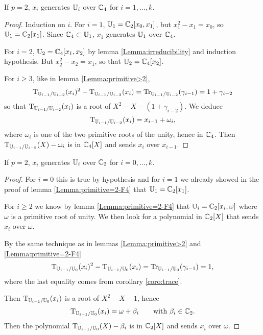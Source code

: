 \begin{lemma}
  \label{Lemma:primitive=2-F4}
  If $p=2$, $x_i$ generates $\mathbb{U}_i$ over $\mathbb{C}_4$ for $i=1,\ldots,k$.
\end{lemma}
\begin{proof}
  Induction on $i$. For $i=1$, $\mathbb{U}_1 = \mathbb{C}_2[x_0,x_1]$, but
  $x_1^2-x_1=x_0$, so $\mathbb{U}_1 = \mathbb{C}_2[x_1]$. Since $\mathbb{C}_4\subset\mathbb{U}_1$,
  $x_1$ generates $\mathbb{U}_1$ over $\mathbb{C}_4$.
  
  For $i=2$, $\mathbb{U}_2=\mathbb{C}_4[x_1,x_2]$ by lemma \ref{Lemma:irreducibility}
  and induction hypothesis. But $x_2^2-x_2=x_1$, so that
  $\mathbb{U}_2=\mathbb{C}_4[x_2]$.

  For $i\ge3$, like in lemma \ref{Lemma:primitive>2},
  \begin{equation*}
    \operatorname{T}_{\mathbb{U}_{i-1}/\mathbb{U}_{i-2}}(x_i)^2 - \operatorname{T}_{\mathbb{U}_{i-1}/\mathbb{U}_{i-2}}(x_i) =
    \operatorname{Tr}_{\mathbb{U}_{i-1}/\mathbb{U}_{i-2}}(\gamma_{i-1}) = 1+\gamma_{i-2}
  \end{equation*}
  so that $\operatorname{T}_{\mathbb{U}_{i-1}/\mathbb{U}_{i-2}}(x_i)$ is a root of
  $X^2-X-(1+\gamma_{i-2})$. We deduce
  \[\operatorname{T}_{\mathbb{U}_{i-1}/\mathbb{U}_{i-2}}(x_i) = x_{i-1} + \omega_i\text{,}\]
  where $\omega_i$ is one of the two primitive roots of the unity,
  hence in $\mathbb{C}_4$. Then $\operatorname{T}_{\mathbb{U}_{i-1}/\mathbb{U}_{i-2}}(X) - \omega_i$ is in
  $\mathbb{C}_4[X]$ and sends $x_i$ over $x_{i-1}$.
\end{proof}

\begin{lemma}
  \label{Lemma:primitive=2}
  If $p=2$, $x_i$ generates $\mathbb{U}_i$ over $\mathbb{C}_2$ for $i=0,\ldots,k$.
\end{lemma}
\begin{proof}
  For $i=0$ this is true by hypothesis and for $i=1$ we already showed
  in the proof of lemma \ref{Lemma:primitive=2-F4} that
  $\mathbb{U}_1=\mathbb{C}_2[x_1]$.

  For $i\ge2$ we know by lemma \ref{Lemma:primitive=2-F4} that
  $\mathbb{U}_i=\mathbb{C}_2[x_i,\omega]$ where $\omega$ is a primitive root of
  unity. We then look for a polynomial in $\mathbb{C}_2[X]$ that sends $x_i$
  over $\omega$.

  By the same technique as in lemmas \ref{Lemma:primitive>2} and
  \ref{Lemma:primitive=2-F4}
  \begin{equation*}
    \operatorname{T}_{\mathbb{U}_{i-1}/\mathbb{U}_0}(x_i)^2-\operatorname{T}_{\mathbb{U}_{i-1}/\mathbb{U}_0}(x_i) = 
    \operatorname{Tr}_{\mathbb{U}_{i-1}/\mathbb{U}_0}(\gamma_{i-1}) = 1 \text{,}
  \end{equation*}
  where the last equality comes from corollary \ref{coro:trace}.
  
  Then $\operatorname{T}_{\mathbb{U}_{i-1}/\mathbb{U}_0}(x_i)$ is a root of $X^2-X-1$, hence
  \begin{equation*}
    \operatorname{T}_{\mathbb{U}_{i-1}/\mathbb{U}_0}(x_i) = \omega + \beta_i
    \qquad\text{with $\beta_i\in\mathbb{C}_2$.}
  \end{equation*}
  Then the polynomial $\operatorname{T}_{\mathbb{U}_{i-1}/\mathbb{U}_0}(X) - \beta_i$ is in
  $\mathbb{C}_2[X]$ and sends $x_i$ over $\omega$.
\end{proof}


%
